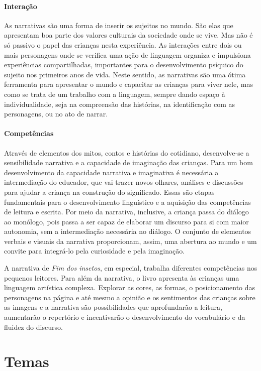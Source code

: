 \documentclass[11pt]{extarticle}
\begin{document}
\paragraph{Interação} 
As narrativas são uma forma de inserir os sujeitos no mundo. 
São elas que apresentam boa parte dos valores culturais da sociedade 
onde se vive. Mas não é só passivo o papel das crianças nesta experiência. 
As interações entre dois ou mais personagens onde se verifica
uma ação de linguagem organiza e impulsiona experiências compartilhadas,
importantes para o desenvolvimento psíquico do sujeito nos primeiros anos de vida.
Neste sentido, as narrativas são uma ótima ferramenta para
apresentar o mundo e capacitar as crianças para viver nele, mas como se
trata de um trabalho com a linguagem, sempre dando espaço à individualidade, 
seja na compreensão das histórias, na identificação com as personagens, ou 
no ato de narrar. 

\paragraph{Competências} 
Através de elementos dos mitos, contos e histórias do cotidiano, desenvolve-se a sensibilidade narrativa e a capacidade de imaginação das crianças. Para um bom desenvolvimento da capacidade narrativa e imaginativa é necessária a intermediação do educador, que vai trazer novos olhares, análises e discussões para ajudar a criança na construção do significado. Essas são etapas fundamentais para o desenvolvimento linguístico e a aquisição das competências de leitura e escrita. Por meio da narrativa, inclusive, a criança passa do diálogo ao monólogo, pois passa a ser capaz de elaborar um discurso para si com maior autonomia, sem a intermediação necessária no diálogo.
O conjunto de elementos verbais e visuais da narrativa proporcionam, assim,
uma abertura ao mundo e um convite para integrá-lo pela curiosidade e pela imaginação.

A narrativa de \textit{Fim dos insetos}, em especial, trabalha diferentes competências
nos pequenos leitores. Para além da narrativa, o livro apresenta às crianças uma linguagem artística complexa.
Explorar as cores, as formas, o posicionamento das personagens 
na página e até mesmo a opinião e os sentimentos das crianças sobre as imagens e a narrativa
são possibilidades que aprofundarão a leitura, aumentarão o repertório 
e incentivarão o desenvolvimento do vocabulário e da fluidez do discurso. 


\section{Temas}
\end{document}
